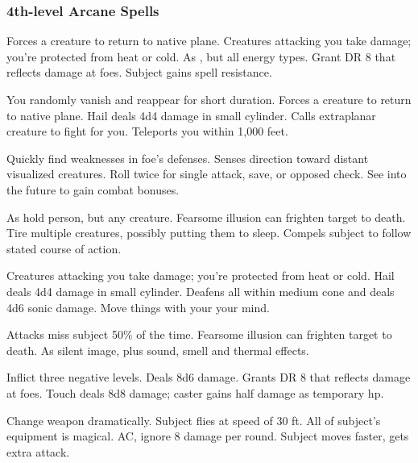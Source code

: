 \subsubsection{4th-level Arcane Spells} 
\begin{swspelllist}
   Forces a creature to return to native plane.
   Creatures attacking you take damage; you're protected from heat or cold.   As , but all energy types.
   Grant DR 8 that reflects damage at foes.
   Subject gains spell resistance.

   You randomly vanish and reappear for short duration.
   Forces a creature to return to native plane.
   Hail deals 4d4 damage in small cylinder.
   Calls extraplanar creature to fight for you.
   Teleports you within 1,000 feet.

   Quickly find weaknesses in foe's defenses.
   Senses direction toward distant visualized creatures.
   Roll twice for single attack, save, or opposed check.
   See into the future to gain combat bonuses.

   As hold person, but any creature.
   Fearsome illusion can frighten target to death.
   Tire multiple creatures, possibly putting them to sleep.
   Compels subject to follow stated course of action.

   Creatures attacking you take damage; you're protected from heat or cold.
   Hail deals 4d4 damage in small cylinder.
   Deafens all within medium cone and deals 4d6 sonic damage.
   Move things with your your mind.

   Attacks miss subject 50\% of the time.
   Fearsome illusion can frighten target to death.
  \spellhead{}
   As silent image, plus sound, smell and thermal effects.

   Inflict three negative levels.
   Deals 8d6 damage.
   Grants DR 8 that reflects damage at foes.
   Touch deals 8d8 damage; caster gains half damage as temporary hp.

   Change weapon dramatically.
   Subject flies at speed of 30 ft.
   All of subject's equipment is magical.
    AC, ignore 8 damage per round.
   Subject moves faster, gets extra attack.
\end{swspelllist}

